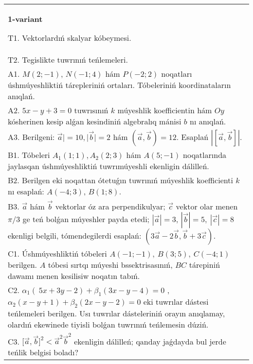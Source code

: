 \documentclass{article}
\begin{document}


\begin{tabular}{m{17cm}}
\textbf{1-variant}
\newline

T1. 
Vektorlardıń skalyar kóbeymesi.
 \\
T2. 
Tegislikte tuwrınıń teńlemeleri.
 \\
A1. 
$M(2;-1)$, $N(-1;4)$ hám $P(-2;2)$ noqatları
úshmúyeshliktiń tárepleriniń ortaları. Tóbeleriniń koordinataların
anıqlań.
 \\
A2. 
$5x-y+3=0$ tuwrısınıń $k$ múyeshlik
koefficientin hám $Oy$ kósherinen kesip alǵan kesindiniń algebralıq
mánisi $b$ nı anıqlań.
 \\
A3. 
Berilgeni: $\overrightarrow{a}| = 10,|\overrightarrow{b}| = 2$ hám
$\left(\overrightarrow{a},\overrightarrow{b} \right) = 12$. Esaplań
$\left| \left\lbrack \overrightarrow{a},\overrightarrow{b} \right\rbrack \right|$.
 \\
B1. 
Tóbeleri $A_1(1; 1), A_2(2; 3)$ hám $A(5;-1)$
noqatlarında jaylasqan úshmúyeshliktiń tuwrımúyeshli ekenligin dálilleń.
 \\
B2. 
Berilgen eki noqattan ótetuǵın tuwrınıń múyeshlik
koefficienti $k$ nı esaplań: $A(-4;3)$, $B(1;8)$.
 \\
B3. 
$\vec{a}$ hám $\vec{b}$ vektorlar óz ara perpendikulyar; $\vec{c}$ vektor olar menen $\pi/3$ ge teń bolǵan múyeshler payda etedi; $|\vec{a}| = 3$, $|\vec{b}| = 5,\ |\vec{c}| = 8$ ekenligi belgili, tómendegilerdi esaplań: 
$\left(3\vec{a} - 2\vec{b},\vec{b} + 3\vec{c} \right)$.
 \\
C1. 
Úshmúyeshliktiń tóbeleri
\(A( - 1; - 1),\ B(3;5),\ C( - 4;1)\) berilgen. $A$ tóbesi sırtqı
múyeshi bssektrisasınıń, $BC$ tárepiniń dawamı menen kesilisiw
noqatın tabıń.
 \\
C2. 
\(\alpha_{1}(\ 5x + 3y - 2) + \beta_{1}(3x - y - 4) = 0\) ,
\(\alpha_{2}(x - y + 1) + \beta_{2}(2x - y - 2) = 0\) eki tuwrılar
dástesi teńlemeleri berilgen. Usı tuwrılar dásteleriniń orayın
anıqlamay, olardıń ekewinede tiyisli bolǵan tuwrınıń teńlemesin dúziń.
 \\
C3. 
\(\lbrack\vec{a},\vec{b}\rbrack^{2} <  {\vec{a}}^{2}{\vec{b}}^{2}\) ekenligin dálilleń; qanday jaǵdayda bul jerde teńlik belgisi boladı?
 \\

\end{tabular}
\vspace{1cm}
\end{document}
